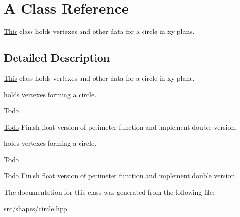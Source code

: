 \hypertarget{classA}{}\section{A Class Reference}
\label{classA}


\mbox{\hyperlink{classThis}{This}} class holds vertexes and other data for a circle in xy plane.  




\subsection{Detailed Description}
\mbox{\hyperlink{classThis}{This}} class holds vertexes and other data for a circle in xy plane. 

holds vertexes forming a circle. \begin{DoxyRefDesc}{Todo}
\item[\mbox{\hyperlink{todo__todo000001}{Todo}}]Finish float version of perimeter function and implement double version. \end{DoxyRefDesc}


holds vertexes forming a circle. \begin{DoxyRefDesc}{Todo}
\item[\mbox{\hyperlink{todo__todo000003}{Todo}}]Finish float version of perimeter function and implement double version. \end{DoxyRefDesc}


The documentation for this class was generated from the following file\+:\begin{DoxyCompactItemize}
\item 
src/shapes/\mbox{\hyperlink{circle_8hpp}{circle.\+hpp}}\end{DoxyCompactItemize}
